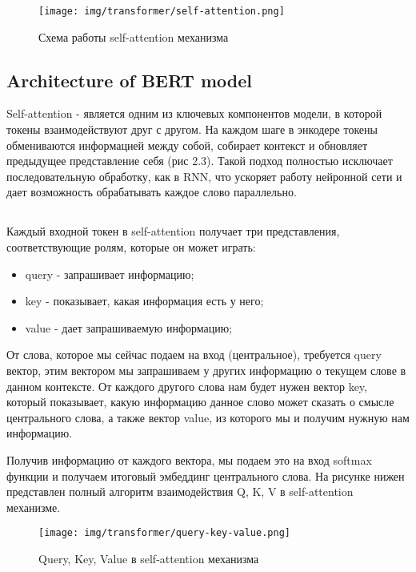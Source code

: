 \documentclass[PMI,VKR]{HSEUniversity}
\begin{document}
\begin{figure}[h]
    \centering
    \texttt{[image: img/transformer/self-attention.png]}
    \caption{Схема работы self-attention механизма}
\end{figure}

\subsection{Architecture of BERT model}

Self-attention - является одним из ключевых компонентов модели, в которой токены взаимодействуют друг с другом. На каждом шаге в энкодере токены обмениваются информацией между собой, собирает контекст и обновляет предыдущее представление себя (рис 2.3). Такой подход полностью исключает последовательную обработку, как в RNN, что ускоряет работу нейронной сети и дает возможность обрабатывать каждое слово параллельно.

\newpage
\subsection{}

Каждый входной токен в self-attention получает три представления, соответствующие ролям, которые он может играть:
\begin{itemize}
    \item query - запрашивает информацию;
    \item key - показывает, какая информация есть у него;
    \item value - дает запрашиваемую информацию;
\end{itemize}

От слова, которое мы сейчас подаем на вход (центральное), требуется query вектор, этим вектором мы запрашиваем у других информацию о текущем слове в данном контексте. От каждого другого слова нам будет нужен вектор key, который показывает, какую информацию данное слово может сказать о смысле центрального слова, а также вектор value, из которого мы и получим нужную нам информацию.

Получив информацию от каждого вектора, мы подаем это на вход softmax функции и получаем итоговый эмбеддинг центрального слова.
На рисунке нижен представлен полный алгоритм взаимодействия Q, K, V в self-attention механизме.

\newpage
\begin{figure}[h]
    \centering
    \texttt{[image: img/transformer/query-key-value.png]}
    \caption{Query, Key, Value в self-attention механизма}
\end{figure}
\end{document}
